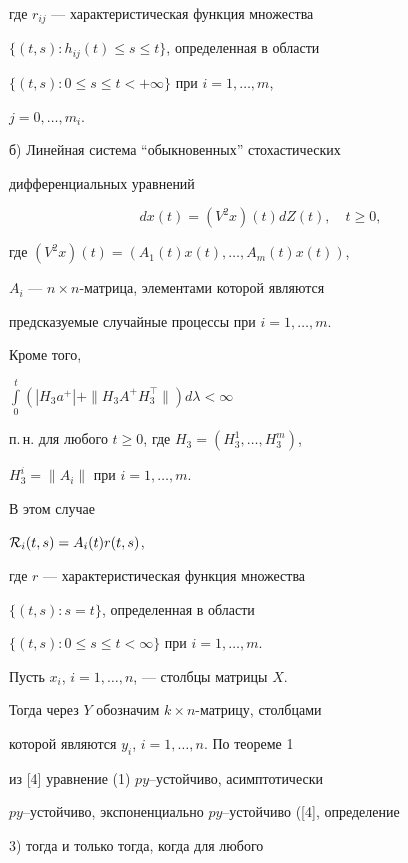 где $r_{ij}$ --- характеристическая функция множества 


$\{(t,s): h_{ij}(t) \le s \le t\}$, определенная в области 


$\{(t,s): 0 \le s \le t < +\infty \}$ при $i = 1,\dotsc, m$, 


$j = 0,\dotsc, m_i$.





б) Линейная система ``обыкновенных'' стохастических 


дифференциальных уравнений


\begin{equation}


dx(t) = (V^2x)(t)dZ(t),\quad t \ge 0,


\end{equation}


где $(V^2x)(t) = (A_1(t)x(t),\dotsc, A_m(t)x(t))$, 


$A_i$ --- $n\times n$-матрица, элементами которой являются 


предсказуемые случайные процессы при $i = 1,\dotsc, m$.


Кроме того, 


$\int \limits_0^t(|H_3a^+| + \|H_3A^+H_3^\top \|)d\lambda < \infty $ 


п.\,н. для любого $t \ge 0$, где $H_3 = (H_3^1,\dotsc, H_3^m)$, 


$H_3^i = \|A_i\|$ при $i = 1,\dotsc, m$. 


В этом случае 


${\cal R}_i(t,s) = A_i(t)r(t,s)$, 


где $r$ --- характеристическая функция множества 


$\{(t,s): s = t\}$, определенная в области 


$\{(t,s): 0 \le s \le t < \infty \}$ при $i = 1,\dotsc, m$.





Пусть $x_i$, $i = 1,\dotsc, n$, --- столбцы матрицы $X$. 


Тогда через $Y$ обозначим $k\times n$-матрицу, столбцами 


которой являются $y_i$, $i = 1,\dotsc, n$. По теореме 1 


из [4] уравнение (1) $py$--устойчиво, асимптотически 


$py$--устойчиво, экспоненциально $py$--устойчиво ([4], определение 


3) тогда и только тогда, когда для любого 


